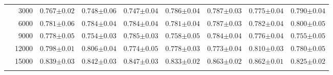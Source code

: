 \begin{table}[p]
\begin{tabularx}{\textwidth}{cr| *{7}{Y}}
& 3000 & $0.767{\scriptscriptstyle\pm0.02}$ & $0.748{\scriptscriptstyle\pm0.06}$ & $0.747{\scriptscriptstyle\pm0.04}$ & $0.786{\scriptscriptstyle\pm0.04}$ & $0.787{\scriptscriptstyle\pm0.03}$ & $0.775{\scriptscriptstyle\pm0.04}$ & $0.790{\scriptscriptstyle\pm0.04}$ \\
& 6000 & $0.781{\scriptscriptstyle\pm0.06}$ & $0.784{\scriptscriptstyle\pm0.04}$ & $0.784{\scriptscriptstyle\pm0.04}$ & $0.781{\scriptscriptstyle\pm0.04}$ & $0.787{\scriptscriptstyle\pm0.03}$ & $0.782{\scriptscriptstyle\pm0.04}$ & $0.800{\scriptscriptstyle\pm0.05}$ \\
& 9000 & $0.778{\scriptscriptstyle\pm0.05}$ & $0.754{\scriptscriptstyle\pm0.03}$ & $0.785{\scriptscriptstyle\pm0.03}$ & $0.758{\scriptscriptstyle\pm0.05}$ & $0.784{\scriptscriptstyle\pm0.04}$ & $0.776{\scriptscriptstyle\pm0.04}$ & $0.755{\scriptscriptstyle\pm0.05}$ \\
& 12000 & $0.798{\scriptscriptstyle\pm0.01}$ & $0.806{\scriptscriptstyle\pm0.04}$ & $0.774{\scriptscriptstyle\pm0.05}$ & $0.778{\scriptscriptstyle\pm0.03}$ & $0.773{\scriptscriptstyle\pm0.04}$ & $0.810{\scriptscriptstyle\pm0.03}$ & $0.780{\scriptscriptstyle\pm0.05}$ \\
& 15000 & $0.839{\scriptscriptstyle\pm0.03}$ & $0.842{\scriptscriptstyle\pm0.03}$ & $0.847{\scriptscriptstyle\pm0.03}$ & $0.833{\scriptscriptstyle\pm0.02}$ & $\mathbf{0.863{\scriptscriptstyle\pm0.02}}$ & $0.862{\scriptscriptstyle\pm0.01}$ & $0.825{\scriptscriptstyle\pm0.02}$ \\
         \\
    \end{tabularx}


\end{table}
